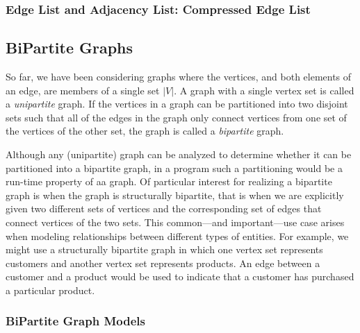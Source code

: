 

\subsubsection{Edge List and Adjacency List: Compressed Edge List}



\subsection{BiPartite Graphs}

So far, we have been considering graphs where the vertices, and both elements of an
edge, are members of a single set $|V|$.  A graph with a single vertex set is called a
\emph{unipartite} graph.  If the vertices in a graph can be partitioned into two
disjoint sets such that all of the edges in the graph only connect vertices from one
set of the vertices of the other set, the graph is called a \emph{bipartite} graph.

Although any (unipartite) graph can be analyzed to determine whether it can be partitioned into a bipartite graph, 
in a program such a partitioning would be a run-time property of aa graph.  Of particular interest for realizing a bipartite graph is when the graph is structurally bipartite, that is when we are explicitly given two different sets of vertices and the corresponding set of edges that connect vertices of the two sets.  This common---and important---use case arises when modeling relationships between different types of entities.  For example, we might use a structurally bipartite graph in which one vertex set represents customers and another vertex set represents products.  An edge between a customer and a product would be used to indicate that a customer has purchased a particular product.



\subsubsection{BiPartite Graph Models}


